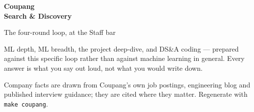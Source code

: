 \documentclass[10pt,twoside]{book}
\begin{document}
\frontmatter
\thispagestyle{empty}
\vspace*{1.9in}
{\sffamily\Huge\bfseries\color{accent} Coupang\\[2pt] Search \& Discovery\par}
\vspace{12pt}
{\sffamily\Large\color{ink} The four-round loop, at the Staff bar\par}
\vspace{26pt}
{\normalsize\color{muted}%
ML depth, ML breadth, the project deep-dive, and DS\&A coding --- prepared
against this specific loop rather than against machine learning in general.
Every answer is what you say out loud, not what you would write down.\par}
\vspace{10pt}
{\small\color{muted}Company facts are drawn from Coupang's own job postings,
engineering blog and published interview guidance; they are cited where they
matter. Regenerate with \texttt{make coupang}.\par}
\cleardoublepage
\tableofcontents
\mainmatter
\end{document}
